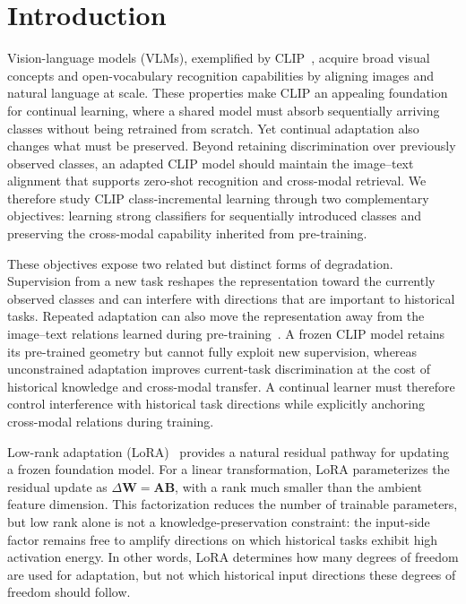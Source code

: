 \section{Introduction}
\label{sec:intro}

Vision-language models (VLMs), exemplified by CLIP~\cite{radford2021learning}, acquire broad visual concepts and open-vocabulary recognition capabilities by aligning images and natural language at scale. These properties make CLIP an appealing foundation for continual learning, where a shared model must absorb sequentially arriving classes without being retrained from scratch. Yet continual adaptation also changes what must be preserved. Beyond retaining discrimination over previously observed classes, an adapted CLIP model should maintain the image--text alignment that supports zero-shot recognition and cross-modal retrieval. We therefore study CLIP class-incremental learning through two complementary objectives: learning strong classifiers for sequentially introduced classes and preserving the cross-modal capability inherited from pre-training.

These objectives expose two related but distinct forms of degradation. Supervision from a new task reshapes the representation toward the currently observed classes and can interfere with directions that are important to historical tasks. Repeated adaptation can also move the representation away from the image--text relations learned during pre-training~\cite{zheng2023zscl,ni2023modx}. A frozen CLIP model retains its pre-trained geometry but cannot fully exploit new supervision, whereas unconstrained adaptation improves current-task discrimination at the cost of historical knowledge and cross-modal transfer. A continual learner must therefore control interference with historical task directions while explicitly anchoring cross-modal relations during training.

Low-rank adaptation (LoRA)~\cite{hu2022lora} provides a natural residual pathway for updating a frozen foundation model. For a linear transformation, LoRA parameterizes the residual update as $\Delta\mathbf{W}=\mathbf{A}\mathbf{B}$, with a rank much smaller than the ambient feature dimension. This factorization reduces the number of trainable parameters, but low rank alone is not a knowledge-preservation constraint: the input-side factor remains free to amplify directions on which historical tasks exhibit high activation energy. In other words, LoRA determines how many degrees of freedom are used for adaptation, but not which historical input directions these degrees of freedom should follow.

